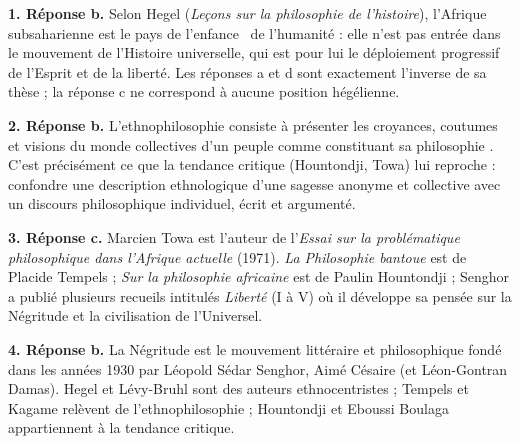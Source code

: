 \documentclass[11pt]{article}
\begin{document}
\begin{corrige}

\textbf{1. Réponse b.} Selon Hegel (\emph{Leçons sur la philosophie de l'histoire}), l'Afrique subsaharienne est \guillemotleft le pays de l'enfance \guillemotright\ de l'humanité : elle n'est pas entrée dans le mouvement de l'Histoire universelle, qui est pour lui le déploiement progressif de l'Esprit et de la liberté. Les réponses a et d sont exactement l'inverse de sa thèse ; la réponse c ne correspond à aucune position hégélienne.

\textbf{2. Réponse b.} L'ethnophilosophie consiste à présenter les croyances, coutumes et visions du monde collectives d'un peuple comme constituant sa \guillemotleft philosophie \guillemotright. C'est précisément ce que la tendance critique (Hountondji, Towa) lui reproche : confondre une description ethnologique d'une sagesse anonyme et collective avec un discours philosophique individuel, écrit et argumenté.

\textbf{3. Réponse c.} Marcien Towa est l'auteur de l'\emph{Essai sur la problématique philosophique dans l'Afrique actuelle} (1971). \emph{La Philosophie bantoue} est de Placide Tempels ; \emph{Sur la \guillemotleft philosophie africaine \guillemotright} est de Paulin Hountondji ; Senghor a publié plusieurs recueils intitulés \emph{Liberté} (I à V) où il développe sa pensée sur la Négritude et la civilisation de l'Universel.

\textbf{4. Réponse b.} La Négritude est le mouvement littéraire et philosophique fondé dans les années 1930 par Léopold Sédar Senghor, Aimé Césaire (et Léon-Gontran Damas). Hegel et Lévy-Bruhl sont des auteurs ethnocentristes ; Tempels et Kagame relèvent de l'ethnophilosophie ; Hountondji et Eboussi Boulaga appartiennent à la tendance critique.

\end{corrige}
\end{document}
